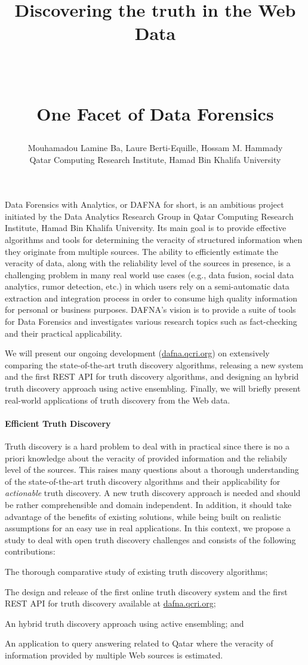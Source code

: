 \documentclass[paper=a4, fontsize=11pt]{scrartcl}	%
\title{ \vspace{-1in} 	\usefont{OT1}{bch}{b}{n}
		\huge \strut Discovering the truth in the Web Data\strut \\
		\Large \bfseries \strut One Facet of Data Forensics\strut
}
\author{ 									\usefont{OT1}{bch}{m}{n}
        Mouhamadou Lamine Ba, Laure Berti-Equille, Hossam M. Hammady\\		\usefont{OT1}{bch}{m}{n}
        Qatar Computing Research Institute, Hamad Bin Khalifa University\\	\usefont{OT1}{bch}{m}{n}
}
\date{}
\numberwithin{equation}{section}															%
\numberwithin{figure}{section}																%
\numberwithin{table}{section}																%
\begin{document}
\maketitle
 \vspace*{-1.5cm}
 Data Forensics with Analytics, or DAFNA for short, is an ambitious project initiated by the Data Analytics Research Group in Qatar Computing Research
 Institute, Hamad Bin Khalifa University. Its main goal is to provide effective algorithms and tools for determining the veracity of structured information when they originate
 from  multiple sources. The ability to efficiently estimate the veracity of data, along with the reliability level of the sources in presence, is a challenging
 problem in many real world use cases (e.g., data fusion, social data analytics, rumor detection, etc.) in which users rely on a semi-automatic data extraction
 and integration process in order to consume high quality information for personal or business purposes. DAFNA's vision is to provide a suite of tools for Data
 Forensics and investigates various research topics such as fact-checking and their practical applicability.

We will present our ongoing development (\url{dafna.qcri.org}) on extensively comparing the state-of-the-art truth discovery algorithms, releasing a new system and 
the first REST API for truth discovery algorithms, and designing an hybrid truth discovery approach using active ensembling. Finally, we will briefly present real-world
applications of truth discovery from the Web data.
 
 \paragraph*{Efficient Truth Discovery}Truth discovery is a hard problem to deal with in practical since there is no a priori knowledge about the veracity of provided 
 information and the reliabily level of the sources. This raises many questions about a thorough understanding of the state-of-the-art truth discovery algorithms and their applicability
 for \emph{actionable} truth discovery. A new truth discovery approach is needed and should be rather comprehensible and domain independent. In addition, it should take advantage of the 
 benefits of existing solutions, while being built on realistic assumptions for an easy use in real applications. In this context, we propose a study to deal with open truth discovery challenges 
 and consists of the following contributions:
 \begin{inparaenum}[(i)]
  \item The thorough comparative study of existing truth discovery algorithms;
  \item The design and release of the first online truth discovery system and 
  the first REST API for truth discovery available at \url{dafna.qcri.org};
  \item An hybrid truth discovery approach using active ensembling; and 
  \item An application to query answering related to Qatar where the veracity of information provided by multiple Web sources is estimated.
 \end{inparaenum}
 \cite{*}
 
 
\end{document}
